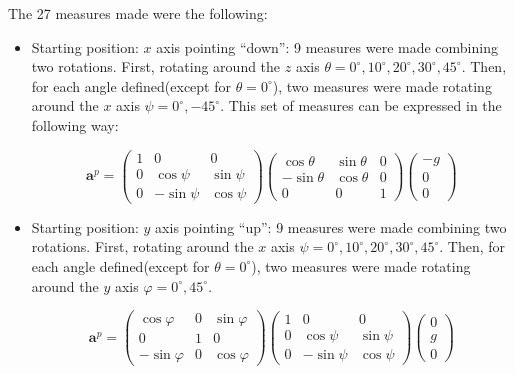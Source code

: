 \documentclass[conference]{IEEEtran}
\begin{document}
The 27 measures made were the following:
\begin{itemize}
\item Starting position: $x$ axis pointing ``down'': 9 measures were made combining two rotations. First, rotating around the $z$ axis $\theta =0^\circ, 10^\circ, 20^\circ, 30^\circ, 45^\circ$. Then, for each angle defined(except for $\theta = 0^\circ$), two measures were made rotating around the $x$ axis $\psi = 0^\circ, -45^\circ$. This set of measures can be expressed in the following way:
\begin{scriptsize}
\begin{equation}
\mathbf{a}^p = \left(\begin{array}{ccc}
1 & 0 & 0\\
0 & \cos \psi & \sin \psi \\
0 & -\sin \psi & \cos \psi
\end{array}\right)\left(\begin{array}{ccc}
\cos \theta & \sin \theta & 0\\
-\sin \theta & \cos \theta & 0\\
0 & 0 & 1
\end{array}\right)\left(\begin{array}{c}
-g\\
0\\
0
\end{array}\right)
\label{eq:acc_x}
\end{equation}
\end{scriptsize}
 

\item Starting position: $y$ axis pointing ``up'': 9 measures were made combining two rotations. First, rotating around the $x$ axis $\psi =0^\circ, 10^\circ, 20^\circ, 30^\circ, 45^\circ$. Then, for each angle defined(except for $\theta = 0^\circ$), two measures were made rotating around the $y$ axis $\varphi = 0^\circ, 45^\circ$.   

\begin{scriptsize}
\begin{equation}
\mathbf{a}^p = \left(\begin{array}{ccc}
\cos \varphi & 0 &\sin \varphi\\
0 & 1 & 0\\
-\sin \varphi & 0 & \cos \varphi
\end{array}\right)\left(\begin{array}{ccc}
1 & 0 & 0\\
0 & \cos \psi & \sin \psi \\
0 & -\sin \psi & \cos \psi
\end{array}\right)\left(\begin{array}{c}
0\\
g\\
0
\end{array}\right)
\label{eq:acc_y}
\end{equation}
\end{scriptsize}


\end{itemize}
\end{document}
